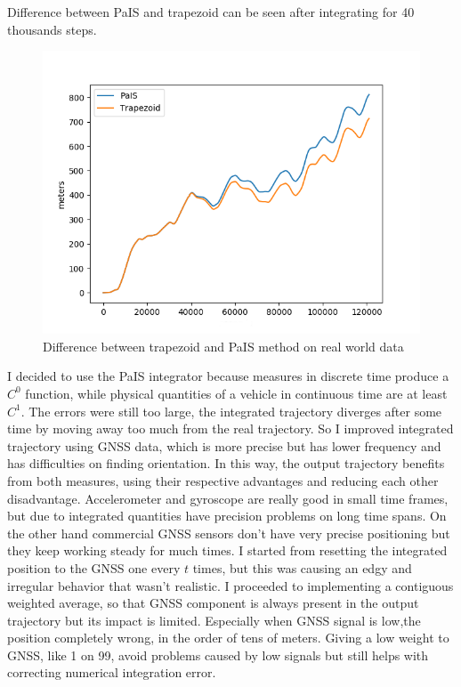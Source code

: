 Difference between PaIS and trapezoid can be seen after integrating for 40 thousands steps.
\begin{figure}[H]
\centering
\includegraphics[scale=0.6]{trapezoid_vs_Pais_real_world.png}
\caption{Difference between trapezoid and PaIS method on real world data}
\end{figure}

\justify
I decided to use the PaIS integrator because measures in discrete time produce a $C^0$ function, while physical quantities of a vehicle in continuous time are at least $C^1$. 
\justify
The errors were still too large, the integrated trajectory diverges after some time by moving away too much from the real trajectory.
So I improved integrated trajectory using GNSS data, which is more precise but has lower frequency and has difficulties on finding orientation. In this way, the output trajectory benefits from both measures, using their respective advantages and reducing each other disadvantage. Accelerometer and gyroscope are really good in small time frames, but due to integrated quantities have precision problems on long time spans. On the other hand commercial GNSS sensors don't have very precise positioning but they keep working steady for much times.
I started from resetting the integrated position to the GNSS one every $t$ times, but this was causing an edgy and irregular behavior that wasn't realistic.
I proceeded to implementing a contiguous weighted average, so that GNSS component is always present in the output trajectory but its impact is limited. Especially when GNSS signal is low,the position completely wrong, in the order of tens of meters. Giving a low weight to GNSS, like 1 on 99, avoid problems caused by low signals but still helps with correcting numerical integration error.

